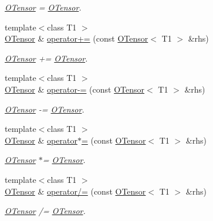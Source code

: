 \begin{DoxyCompactItemize}
\begin{DoxyCompactList}\small\item\em \mbox{\hyperlink{classENSEM_1_1OTensor}{O\+Tensor}} = \mbox{\hyperlink{classENSEM_1_1OTensor}{O\+Tensor}}. \end{DoxyCompactList}\item 
{\footnotesize template$<$class T1 $>$ }\\\mbox{\hyperlink{classENSEM_1_1OTensor}{O\+Tensor}} \& \mbox{\hyperlink{classENSEM_1_1OTensor_a621ebf0d6d94eb56c1e3b31cb8c933b1}{operator+=}} (const \mbox{\hyperlink{classENSEM_1_1OTensor}{O\+Tensor}}$<$ T1 $>$ \&rhs)
\begin{DoxyCompactList}\small\item\em \mbox{\hyperlink{classENSEM_1_1OTensor}{O\+Tensor}} += \mbox{\hyperlink{classENSEM_1_1OTensor}{O\+Tensor}}. \end{DoxyCompactList}\item 
{\footnotesize template$<$class T1 $>$ }\\\mbox{\hyperlink{classENSEM_1_1OTensor}{O\+Tensor}} \& \mbox{\hyperlink{classENSEM_1_1OTensor_a8a087d8889bb41eafd237e270e4182fa}{operator-\/=}} (const \mbox{\hyperlink{classENSEM_1_1OTensor}{O\+Tensor}}$<$ T1 $>$ \&rhs)
\begin{DoxyCompactList}\small\item\em \mbox{\hyperlink{classENSEM_1_1OTensor}{O\+Tensor}} -\/= \mbox{\hyperlink{classENSEM_1_1OTensor}{O\+Tensor}}. \end{DoxyCompactList}\item 
{\footnotesize template$<$class T1 $>$ }\\\mbox{\hyperlink{classENSEM_1_1OTensor}{O\+Tensor}} \& \mbox{\hyperlink{classENSEM_1_1OTensor_a6edba72b265fa3629417ad85c9ae1477}{operator$\ast$=}} (const \mbox{\hyperlink{classENSEM_1_1OTensor}{O\+Tensor}}$<$ T1 $>$ \&rhs)
\begin{DoxyCompactList}\small\item\em \mbox{\hyperlink{classENSEM_1_1OTensor}{O\+Tensor}} $\ast$= \mbox{\hyperlink{classENSEM_1_1OTensor}{O\+Tensor}}. \end{DoxyCompactList}\item 
{\footnotesize template$<$class T1 $>$ }\\\mbox{\hyperlink{classENSEM_1_1OTensor}{O\+Tensor}} \& \mbox{\hyperlink{classENSEM_1_1OTensor_af8fb32358b6c05989221297a9b33096c}{operator/=}} (const \mbox{\hyperlink{classENSEM_1_1OTensor}{O\+Tensor}}$<$ T1 $>$ \&rhs)
\begin{DoxyCompactList}\small\item\em \mbox{\hyperlink{classENSEM_1_1OTensor}{O\+Tensor}} /= \mbox{\hyperlink{classENSEM_1_1OTensor}{O\+Tensor}}. \end{DoxyCompactList}\item 

\end{DoxyCompactItemize}
